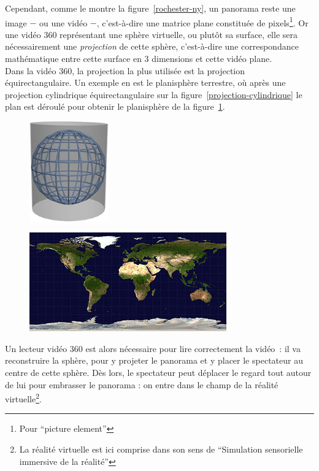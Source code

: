 \newline
Cependant, comme le montre la figure~\ref{rochester-ny}, un panorama reste une image
$-$ ou une vidéo $-$, c'est-à-dire une matrice plane constituée de pixels\footnote{Pour
 \enquote{picture element}}. Or une vidéo 360 représentant une sphère virtuelle, ou
plutôt sa surface, elle sera nécessairement une \emph{projection} de cette sphère, 
c'est-à-dire une correspondance mathématique entre cette surface en 3 dimensions 
et cette vidéo plane\cite{projection-cartographique}.\\
Dans la vidéo 360, la projection la plus utilisée est la projection équirectangulaire\cite{what-is-equirectangular}.
Un exemple en est le planisphère terrestre, où après une projection cylindrique équirectangulaire
sur la figure~\ref{projection-cylindrique} le plan est déroulé pour obtenir le 
planisphère de la figure~\ref{planisphère}.
\begin{figure}
  \centering
  \begin{minipage}[t]{0.35\textwidth}
    \centering
    \includegraphics[width=3.4cm]{images/projection-cylindrique.png}
    \label{projection-cylindrique}
  \end{minipage}%
  \hspace{0.04\textwidth}
  \begin{minipage}[t]{0.6\textwidth}
    \centering
    \includegraphics[width=8.5cm]{images/equirectangular-projection.jpg}
    \label{planisphère}
  \end{minipage}
\end{figure}
\newline
Un lecteur vidéo 360 est alors nécessaire pour lire correctement la vidéo~: 
il va reconstruire la sphère, pour y projeter le panorama et y placer le
spectateur au centre de cette sphère. Dès lors, le spectateur peut déplacer le 
regard tout autour de lui pour embrasser le panorama : on entre dans le champ de 
la réalité virtuelle\footnote{La réalité virtuelle est ici comprise dans son sens
  de \enquote{Simulation sensorielle immersive de la réalité}\cite{definition-rv}}.

